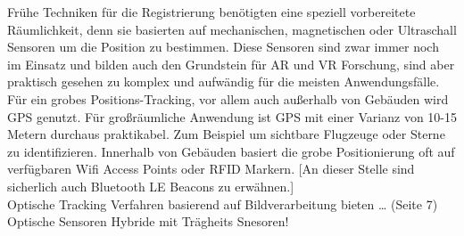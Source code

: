 Frühe Techniken für die Registrierung benötigten eine speziell vorbereitete Räumlichkeit, denn sie basierten auf mechanischen, magnetischen oder Ultraschall Sensoren um die Position zu bestimmen. Diese Sensoren sind zwar immer noch im Einsatz und bilden auch den Grundstein für AR und VR Forschung, sind aber praktisch gesehen zu komplex und aufwändig für die meisten Anwendungsfälle.\\

Für ein grobes Positions-Tracking, vor allem auch außerhalb von Gebäuden wird GPS genutzt. Für großräumliche Anwendung ist GPS mit einer Varianz von 10-15 Metern durchaus praktikabel. Zum Beispiel um sichtbare Flugzeuge oder Sterne zu identifizieren. Innerhalb von Gebäuden basiert die grobe Positionierung oft auf verfügbaren Wifi Access Points oder RFID Markern. [An dieser Stelle sind sicherlich auch Bluetooth LE Beacons zu erwähnen.]\\

Optische Tracking Verfahren basierend auf Bildverarbeitung bieten … (Seite 7)
Optische Sensoren
Hybride mit Trägheits Snesoren!


